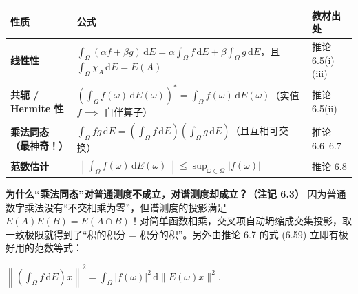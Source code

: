 \documentclass[11pt,a4paper]{article}
\newcounter{none}
\renewenvironment{quote}{%
  \begin{tcolorbox}[
    enhanced,
    breakable,
    colback=AccentSoft!48!white,
    colframe=AccentMain,
    boxrule=0pt,
    leftrule=2.8pt,
    arc=2.5pt,
    left=9pt, right=8pt, top=6pt, bottom=6pt,
    before skip=5.5pt, after skip=5.5pt
  ]\small
}{%
  \end{tcolorbox}%
}
\newcommand{\FitDisplayMath}[1]{%
  \par\vspace{4.5pt}\noindent
  \begin{adjustbox}{max width=\linewidth, center}
    $\displaystyle #1$
  \end{adjustbox}
  \par\vspace{4.5pt}%
}
\begin{document}
{\def\LTcaptype{none} %
{\small\renewcommand{\arraystretch}{1.38}\setlength{\tabcolsep}{5pt}
\begin{longtable}[]{@{}
  >{\raggedright\arraybackslash}p{}
  >{\raggedright\arraybackslash}p{}
  >{\centering\arraybackslash}p{}@{}}
\toprule\noalign{}
\rowcolor{AccentSoft}
\begin{minipage}[b]{\linewidth}\raggedright
性质
\end{minipage} & \begin{minipage}[b]{\linewidth}\raggedright
公式
\end{minipage} & \begin{minipage}[b]{\linewidth}\centering
教材出处
\end{minipage} \\
\midrule\noalign{}
\endhead
\bottomrule\noalign{}
\endlastfoot
\textbf{线性性} & \(\displaystyle \int_\Omega (\alpha f + \beta g)\,\mathrm{d}E = \alpha \int_\Omega f\,\mathrm{d}E + \beta \int_\Omega g\,\mathrm{d}E\)，且 \(\displaystyle \int_\Omega \chi_A \,\mathrm{d}E = E(A)\) & 推论 6.5(i)(iii) \\
\textbf{共轭 / Hermite 性} & \(\displaystyle \left(\int_\Omega f(\omega)\,\mathrm{d}E(\omega)\right)^* = \int_\Omega \overline{f(\omega)}\,\mathrm{d}E(\omega)\)（实值 \(f \implies\) 自伴算子） & 推论 6.5(ii) \\
\textbf{乘法同态（最神奇！）} & \(\displaystyle \int_\Omega f g\,\mathrm{d}E = \left(\int_\Omega f\,\mathrm{d}E\right)\left(\int_\Omega g\,\mathrm{d}E\right)\)（且互相可交换） & 推论 6.6--6.7 \\
\textbf{范数估计} & \(\displaystyle \left\lVert\int_\Omega f(\omega)\,\mathrm{d}E(\omega)\right\rVert \le \sup_{\omega \in \Omega} \lvert f(\omega) \rvert\) & 推论 6.8 \\
\end{longtable}
}
}

\begin{quote}
\textbf{为什么``乘法同态''对普通测度不成立，对谱测度却成立？（注记 6.3）} 因为普通数字乘法没有``不交相乘为零''，但谱测度的投影满足 \(E(A)E(B) = E(A \cap B)\)！对简单函数相乘，交叉项自动坍缩成交集投影，取一致极限就得到了``积的积分 = 积分的积''。另外由推论 6.7 的式 (6.59) 立即有极好用的范数等式： 
\FitDisplayMath{\left\|\left(\int_\Omega f\,\mathrm{d}E\right)x\right\|^2 = \int_\Omega |f(\omega)|^2 \,\mathrm{d}\|E(\omega)x\|^2.}

\end{quote}
\end{document}
